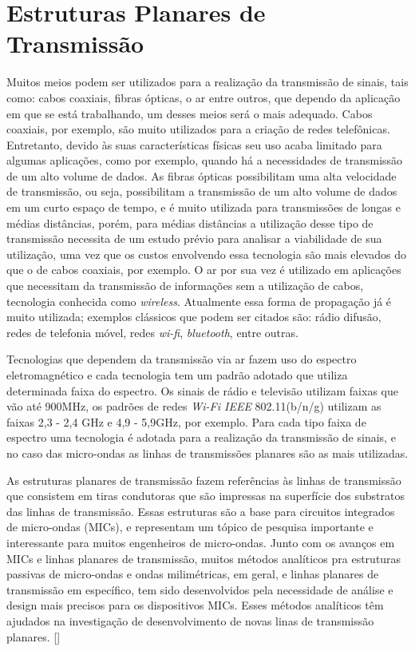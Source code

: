 \chapter{Estruturas Planares de Transmissão}

Muitos meios podem ser utilizados para a realização da transmissão de sinais, tais como: cabos coaxiais, fibras ópticas, o ar entre outros, que dependo da aplicação em que se está trabalhando,	um desses meios será o mais adequado. Cabos coaxiais, por exemplo, são muito utilizados para a criação de redes telefônicas. Entretanto, devido às suas características físicas seu uso acaba limitado para algumas aplicações, como por exemplo, quando há a necessidades de transmissão de um alto volume de dados. As fibras ópticas possibilitam uma alta velocidade de transmissão, ou seja, possibilitam a transmissão de um alto volume de dados em um curto espaço de tempo, e é muito utilizada para transmissões de longas e médias distâncias, porém, para médias distâncias a utilização desse tipo de transmissão necessita de um estudo prévio para analisar a viabilidade de sua utilização, uma vez que os custos envolvendo essa tecnologia são mais elevados do que o de cabos coaxiais, por exemplo. O ar por sua vez é utilizado em aplicações que necessitam da transmissão de informações sem  a utilização de cabos, tecnologia conhecida como \textit{wireless}. Atualmente essa forma de propagação já é muito utilizada; exemplos clássicos que podem ser citados são: rádio difusão, redes de telefonia móvel, redes \textit{wi-fi}, \textit{bluetooth}, entre outras.

Tecnologias que dependem da transmissão via ar fazem uso do espectro eletromagnético e cada tecnologia tem um padrão adotado que utiliza determinada faixa do espectro. Os sinais de rádio e televisão utilizam faixas que vão até 900MHz, os padrões de redes \textit{Wi-Fi IEEE} 802.11(b/n/g) utilizam as faixas 2,3 - 2,4 GHz e 4,9 - 5,9GHz, por exemplo. Para cada tipo faixa de espectro uma tecnologia é adotada para a realização da transmissão de sinais, e no caso das micro-ondas as linhas de transmissões planares são as mais utilizadas.

As estruturas planares de transmissão fazem referências às linhas de transmissão que consistem em tiras condutoras que são impressas na superfície dos substratos das linhas de transmissão. Essas estruturas são a base para circuitos integrados de micro-ondas (MICs), e representam um tópico de pesquisa importante e interessante para muitos engenheiros de micro-ondas. Junto com os avanços em MICs e linhas planares de transmissão, muitos métodos analíticos pra estruturas passivas de micro-ondas e ondas milimétricas, em geral, e linhas planares de transmissão em específico, tem sido desenvolvidos pela necessidade de análise e design mais precisos para os dispositivos MICs. Esses métodos analíticos  têm ajudados na investigação de desenvolvimento de novas linas de transmissão planares.
[\cite{Nguyen}]

